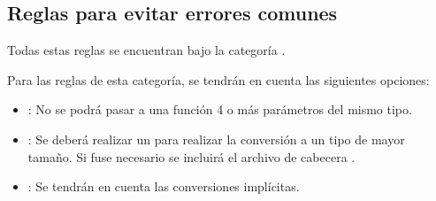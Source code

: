 \subsection{Reglas para evitar errores comunes}

Todas estas reglas se encuentran bajo la categoría .

Para las reglas de esta categoría, se tendrán en cuenta las siguientes
opciones:

\begin{itemize}

\item {}: No se podrá pasar a una
función 4 o más parámetros del mismo tipo.

\item {}: Se deberá
realizar un  para realizar la conversión a un tipo
de mayor tamaño. Si fuse necesario se incluirá el archivo de cabecera 
.

\item {}: Se tendrán en cuenta las
conversiones implícitas.

\end{itemize}
